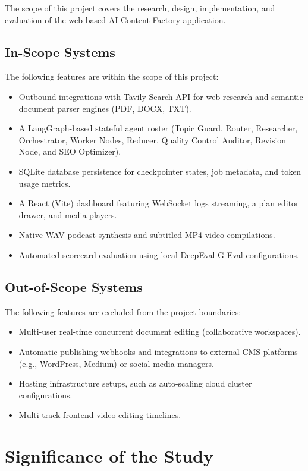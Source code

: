 The scope of this project covers the research, design, implementation, and evaluation of the web-based AI Content Factory application. 

\subsection{In-Scope Systems}
The following features are within the scope of this project:
\begin{itemize}
    \item Outbound integrations with Tavily Search API for web research and semantic document parser engines (PDF, DOCX, TXT).
    \item A LangGraph-based stateful agent roster (Topic Guard, Router, Researcher, Orchestrator, Worker Nodes, Reducer, Quality Control Auditor, Revision Node, and SEO Optimizer).
    \item SQLite database persistence for checkpointer states, job metadata, and token usage metrics.
    \item A React (Vite) dashboard featuring WebSocket logs streaming, a plan editor drawer, and media players.
    \item Native WAV podcast synthesis and subtitled MP4 video compilations.
    \item Automated scorecard evaluation using local DeepEval G-Eval configurations.
\end{itemize}

\subsection{Out-of-Scope Systems}
The following features are excluded from the project boundaries:
\begin{itemize}
    \item Multi-user real-time concurrent document editing (collaborative workspaces).
    \item Automatic publishing webhooks and integrations to external CMS platforms (e.g., WordPress, Medium) or social media managers.
    \item Hosting infrastructure setups, such as auto-scaling cloud cluster configurations.
    \item Multi-track frontend video editing timelines.
\end{itemize}

\section{Significance of the Study}

